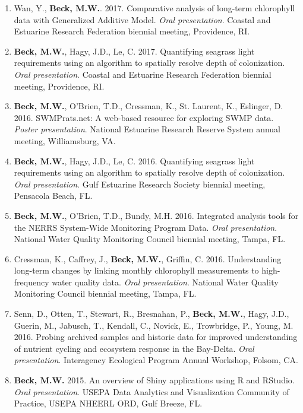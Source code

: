\documentclass[letterpaper,12pt]{article}
\begin{document}
\begin{enumerate}

\item Wan, Y., {\bf Beck, M.W.}. 2017. Comparative analysis of long-term chlorophyll data with Generalized Additive Model. \textit{Oral presentation}. Coastal and Estuarine Research Federation biennial meeting, Providence, RI.

\item {\bf Beck, M.W.}, Hagy, J.D., Le, C. 2017. Quantifying seagrass light requirements using an algorithm to spatially resolve depth of colonization. \textit{Oral presentation}. Coastal and Estuarine Research Federation biennial meeting, Providence, RI.

\item {\bf Beck, M.W.}, O'Brien, T.D., Cressman, K., St. Laurent, K., Eslinger, D. 2016. SWMPrats.net: A web-based resource for exploring SWMP data. \textit{Poster presentation}. National Estuarine Research Reserve System annual meeting, Williamsburg, VA. 

\item {\bf Beck, M.W.}, Hagy, J.D., Le, C. 2016. Quantifying seagrass light requirements using an algorithm to spatially resolve depth of colonization. \textit{Oral presentation}. Gulf Estuarine Research Society biennial meeting, Pensacola Beach, FL.

\item {\bf Beck, M.W.}, O'Brien, T.D., Bundy, M.H. 2016. Integrated analysis tools for the NERRS System-Wide Monitoring Program Data. \textit{Oral presentation}. National Water Quality Monitoring Council biennial meeting, Tampa, FL.

\item Cressman, K., Caffrey, J., {\bf Beck, M.W.}, Griffin, C. 2016. Understanding long-term changes by linking monthly chlorophyll measurements to high-frequency water quality data. \textit{Oral presentation}. National Water Quality Monitoring Council biennial meeting, Tampa, FL.

\item Senn, D., Otten, T., Stewart, R., Bresnahan, P., {\bf Beck, M.W.}, Hagy, J.D., Guerin, M., Jabusch, T., Kendall, C., Novick, E., Trowbridge, P., Young, M. 2016. Probing archived samples and historic data for improved understanding of nutrient cycling and ecosystem response in the Bay-Delta. \textit{Oral presentation}. Interagency Ecological Program Annual Workshop, Folsom, CA.

\item {\bf Beck, M.W.} 2015. An overview of Shiny applications using R and RStudio. \textit{Oral presentation}. USEPA Data Analytics and Visualization Community of Practice, USEPA NHEERL ORD, Gulf Breeze, FL.


\end{enumerate}
\end{document}
